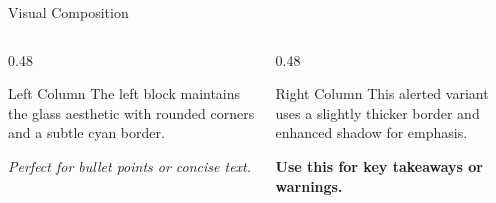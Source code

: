 \documentclass[aspectratio=169]{beamer}
\begin{document}
\begin{frame}{Visual Composition}
    
    \begin{columns}[T]
        \begin{column}{0.48\textwidth}
            \begin{block}{Left Column}
                The left block maintains the glass aesthetic with 
                rounded corners and a subtle cyan border. 
                
                \vspace{0.3cm}
                \textit{Perfect for bullet points or concise text.}
            \end{block}
        \end{column}
        
        \begin{column}{0.48\textwidth}
            \begin{alertblock}{Right Column}
                This alerted variant uses a slightly thicker border 
                and enhanced shadow for emphasis.
                
                \vspace{0.3cm}
                \textbf{Use this for key takeaways or warnings.}
            \end{alertblock}
        \end{column}
    \end{columns}
    
    \vspace{0.5cm}
    \begin{center}
    \end{center}
    
\end{frame}
\end{document}

